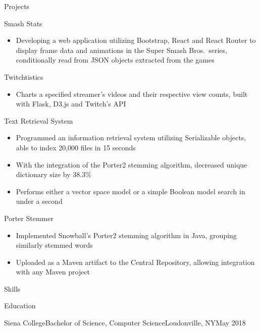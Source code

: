 \documentclass[]{xjavathehutt}
\begin{document}
\begin{cvsection}{Projects}
  \begin{cvproject}{Smash Stats}
    \begin{itemize}
      \item{Developing a web application utilizing Bootstrap, React and React Router to display
          frame data and animations in the Super Smash Bros.\ series, conditionally read from
          JSON objects extracted from the games}
    \end{itemize}
  \end{cvproject}

  \begin{cvproject}{Twitchtistics}
    \begin{itemize}
      \item{Charts a specified streamer's videos and their respective view counts, built with Flask,
        D3.js and Twitch's API}
    \end{itemize}
  \end{cvproject}

  \begin{cvproject}{Text Retrieval System}
    \begin{itemize}
      \item{Programmed an information retrieval system utilizing Serializable objects, able to index 20,000 files in 15 seconds}
      \item{With the integration of the Porter2 stemming algorithm, decreased unique dictionary size by 38.3\%}
      \item{Performs either a vector space model or a simple Boolean model search in under a second}
    \end{itemize}
  \end{cvproject}

  \begin{cvproject}{Porter Stemmer}
    \begin{itemize}
      \item{Implemented Snowball's Porter2 stemming algorithm in Java, grouping similarly stemmed words}
      \item{Uploaded as a Maven artifact to the Central Repository, allowing integration with any Maven project}
    \end{itemize}
  \end{cvproject}
\end{cvsection}


\begin{cvsection}{Skills}
  \printskills
\end{cvsection}


\begin{cvsection}{Education}
  \begin{cvsubsection}{Siena College}{Bachelor of Science, Computer Science}{Loudonville, NY}{May 2018}
  \end{cvsubsection}
\end{cvsection}


\end{document}
